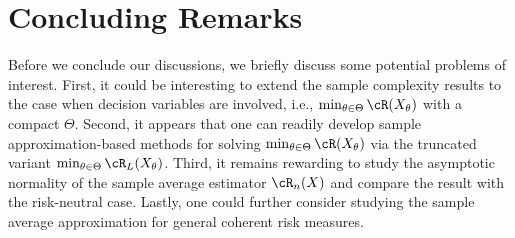 \documentclass[9pt]{article} %
\numberwithin{equation}{section}
\begin{document}


\section{Concluding Remarks}\label{sec_appendix}

Before we conclude our discussions, we briefly discuss some potential problems of interest.
First, it could be  interesting to extend the sample complexity results to the case when decision variables are involved,  i.e., $\min_{\theta \in \Theta} \cR(X_\theta)$ with a compact $\Theta$.
Second, it appears that one can readily develop sample approximation-based methods \cite{nemirovski2009robust} for solving $\min_{\theta \in \Theta} \cR (X_\theta)$ via the truncated variant $\min_{\theta \in \Theta} \cR_L (X_\theta)$.
Third, it remains rewarding to study the asymptotic normality of the sample average estimator $\cR_n(X)$ and compare the result with the risk-neutral case. 
Lastly, one could further consider studying the sample average approximation for general coherent risk measures.  







%
\end{document}
